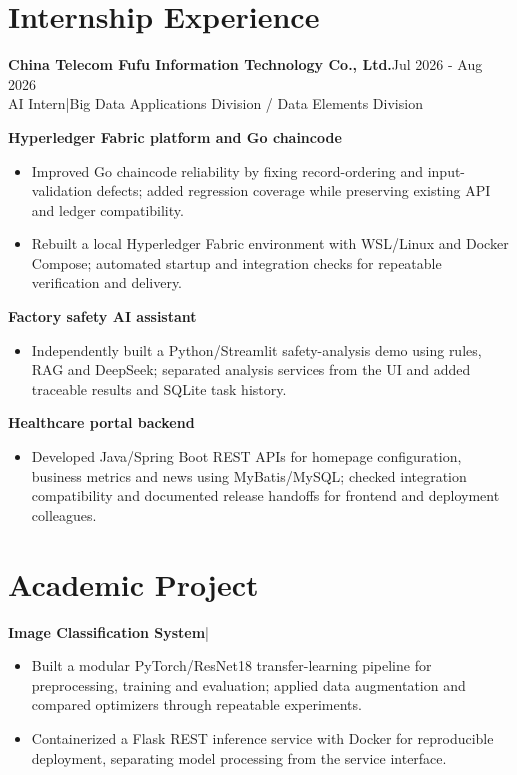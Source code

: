 \documentclass[11pt,a4paper]{article}
\newcommand{\project}[1]{\par\vspace{2pt}\textbf{#1}\par}
\begin{document}
\section*{Internship Experience}
\textbf{China Telecom Fufu Information Technology Co., Ltd.}\hfill Jul 2026 - Aug 2026\\
AI Intern\enspace|\enspace Big Data Applications Division / Data Elements Division
\project{Hyperledger Fabric platform and Go chaincode}
\begin{itemize}
\item Improved Go chaincode reliability by fixing record-ordering and input-validation defects; added regression coverage while preserving existing API and ledger compatibility.
\item Rebuilt a local Hyperledger Fabric environment with WSL/Linux and Docker Compose; automated startup and integration checks for repeatable verification and delivery.
\end{itemize}
\project{Factory safety AI assistant}
\begin{itemize}
\item Independently built a Python/Streamlit safety-analysis demo using rules, RAG and DeepSeek; separated analysis services from the UI and added traceable results and SQLite task history.
\end{itemize}
\project{Healthcare portal backend}
\begin{itemize}
\item Developed Java/Spring Boot REST APIs for homepage configuration, business metrics and news using MyBatis/MySQL; checked integration compatibility and documented release handoffs for frontend and deployment colleagues.
\end{itemize}

\section*{Academic Project}
\textbf{Image Classification System}\enspace|
\begin{itemize}
\item Built a modular PyTorch/ResNet18 transfer-learning pipeline for preprocessing, training and evaluation; applied data augmentation and compared optimizers through repeatable experiments.
\item Containerized a Flask REST inference service with Docker for reproducible deployment, separating model processing from the service interface.
\end{itemize}
\end{document}
